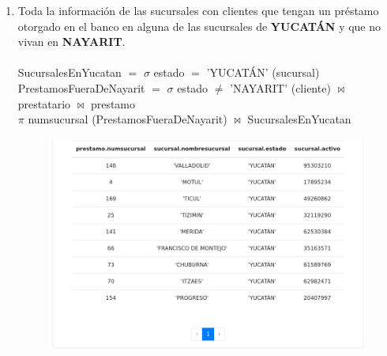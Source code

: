 \documentclass{exam}
\begin{document}
\begin{questions}
\begin{enumerate}[label=\alph*.]
		
		\newpage
		\item Toda la información de las sucursales con clientes que tengan un préstamo otorgado en el banco en alguna de las sucursales de \textbf{YUCATÁN} y que no vivan en \textbf{NAYARIT}.\\\\
		SucursalesEnYucatan $=$ $\sigma$ estado $=$ 'YUCATÁN' (sucursal)\\
		PrestamosFueraDeNayarit $=$ $\sigma$ estado $\neq$ 'NAYARIT' (cliente) $\bowtie$ prestatario $\bowtie$ prestamo\\
		$\pi$ numsucursal (PrestamosFueraDeNayarit) $\bowtie$ SucursalesEnYucatan\\
		\begin{center}
		\begin{figure}[h!]
			\includegraphics[width=17cm]{imgs/2d.png}
			\centering
		\end{figure}	
		\end{center}
		

\end{enumerate}
\end{questions}
\end{document}
